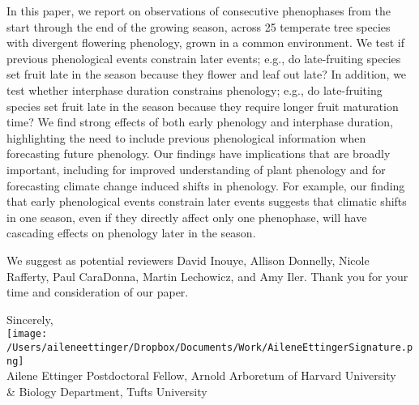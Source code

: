 \documentclass[10.95pt,a4paper]{letter}
\begin{document}
\begin{letter}{}
In this paper, we report on observations of consecutive phenophases from the start through the end of the growing season, across 25 temperate tree species with divergent flowering phenology, grown in a common environment. We test if previous phenological events constrain later events; e.g., do late-fruiting species set fruit late in the season because they flower and leaf out late? In addition, we test whether interphase duration constrains phenology; e.g., do late-fruiting species set fruit late in the season because they require longer fruit maturation time? We find strong effects of both early phenology and interphase duration, highlighting the need to include previous phenological information when forecasting future phenology. Our findings have implications that are broadly important, including  for improved understanding of plant phenology and for forecasting climate change induced shifts in phenology. For example, our finding that early phenological events constrain later events suggests that climatic shifts in one season, even if they directly affect only one phenophase, will have cascading effects on phenology later in the season. 

We suggest as potential reviewers David Inouye, Allison Donnelly, Nicole Rafferty, Paul CaraDonna, Martin Lechowicz, and Amy Iler. Thank you for your time and consideration of our paper. 


Sincerely,\\

\texttt{[image: /Users/aileneettinger/Dropbox/Documents/Work/AileneEttingerSignature.png]} \\
Ailene Ettinger
Postdoctoral Fellow, Arnold Arboretum of Harvard University \\ \& Biology Department, Tufts University


\clearpage



\end{letter}
\end{document}
